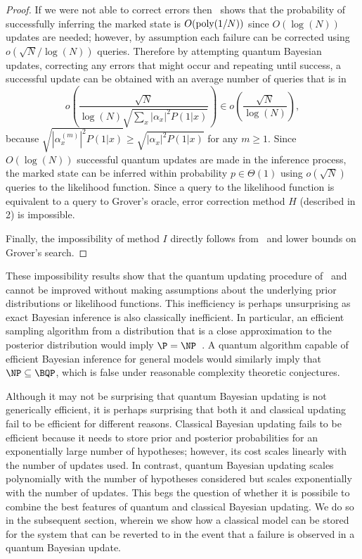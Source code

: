 \documentclass[aps,amsmath,onecolumn,amssymb]{revtex4}
\begin{document}
\begin{proof}
If we were not able to correct errors then~ shows that the probability of successfully inferring the marked state is $O({\rm poly}(1/N))$ since $O(\log(N))$ updates are needed; however, by assumption each failure can be corrected using $o(\sqrt{N}/\log(N))$ queries.  Therefore by attempting quantum Bayesian updates, correcting any errors that might occur and repeating until success, a successful update can be
obtained with an average number of queries that is in
\begin{equation}
o\left( \frac{\sqrt{N}}{\log(N)\sqrt{\sum_x |\alpha_x|^2 P(1|x)}}\right)\in o\left(\frac{\sqrt{N}}{\log(N)} \right),
\end{equation}
because $\sqrt{|\alpha_x^{(m)}|^2 P(1|x)}\ge \sqrt{|\alpha_x|^2 P(1|x)}$ for any $m\ge 1$.
Since $O(\log(N))$ successful quantum updates are made in the inference process, the marked state can be inferred within probability $p\in \Theta(1)$ using $o(\sqrt{N})$ queries to the likelihood function.  Since a query
to the likelihood function is equivalent to a query to Grover's oracle, error correction method $H$ (described in 2) is impossible.

Finally, the impossibility of method $I$ directly follows from~ and lower bounds on Grover's search.
\end{proof}

These impossibility results show that the quantum updating procedure of~\cite{LYC14} and~ cannot be improved  without making assumptions about the underlying prior distributions or likelihood functions.  This inefficiency is perhaps unsurprising as exact Bayesian inference is also classically inefficient.  In particular, an efficient sampling algorithm from a distribution that is a close approximation to the  posterior distribution would imply $\P=\NP$~\cite{dagum1993approximating}.  A quantum algorithm capable of efficient Bayesian inference for general models would similarly imply that $\NP \subseteq \BQP$, which is false under reasonable complexity theoretic conjectures.

Although it may not be surprising that quantum Bayesian updating is not generically efficient, it is perhaps surprising that both it and classical updating fail to be efficient for different reasons.  Classical Bayesian updating fails to be efficient because it needs to store prior and posterior probabilities for an exponentially large number of hypotheses; however, its cost scales linearly with the number of updates used.  In contrast, quantum Bayesian updating scales polynomially with the number of hypotheses considered but scales exponentially with the number of updates.  This begs the question of whether it is possibile to combine the best features of quantum and classical Bayesian updating.  We do so in the subsequent section, wherein we show how a classical model can be stored for the system that can be reverted to in the event that a failure is observed in a quantum Bayesian update.
\end{document}
